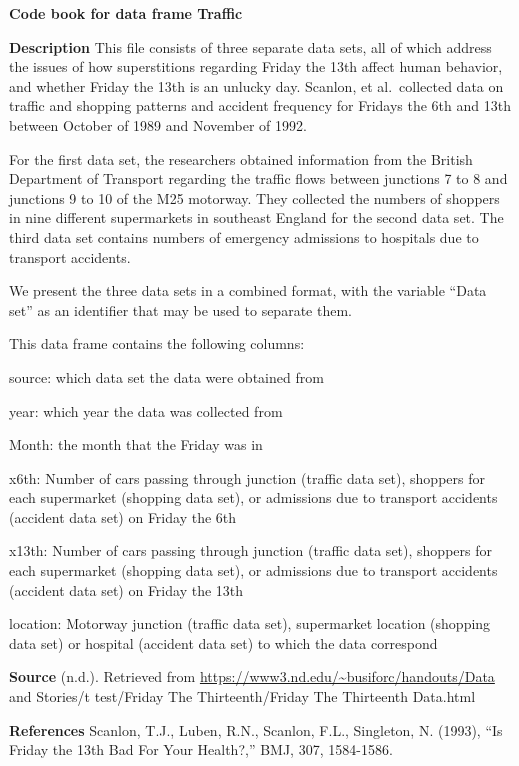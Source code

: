 \documentclass[
]{book}
\begin{document}
\textbf{Code book for data frame Traffic}

\textbf{Description}
This file consists of three separate data sets, all of which address the issues of how superstitions regarding Friday the 13th affect human behavior, and whether Friday the 13th is an unlucky day. Scanlon, et al.~collected data on traffic and shopping patterns and accident frequency for Fridays the 6th and 13th between October of 1989 and November of 1992.

For the first data set, the researchers obtained information from the British Department of Transport regarding the traffic flows between junctions 7 to 8 and junctions 9 to 10 of the M25 motorway. They collected the numbers of shoppers in nine different supermarkets in southeast England for the second data set. The third data set contains numbers of emergency admissions to hospitals due to transport accidents.

We present the three data sets in a combined format, with the variable ``Data set'' as an identifier that may be used to separate them.

This data frame contains the following columns:

source: which data set the data were obtained from

year: which year the data was collected from

Month: the month that the Friday was in

x6th: Number of cars passing through junction (traffic data set), shoppers for each supermarket (shopping data set), or admissions due to transport accidents (accident data set) on Friday the 6th

x13th: Number of cars passing through junction (traffic data set), shoppers for each supermarket (shopping data set), or admissions due to transport accidents (accident data set) on Friday the 13th

location: Motorway junction (traffic data set), supermarket location (shopping data set) or hospital (accident data set) to which the data correspond

\textbf{Source}
(n.d.). Retrieved from \url{https://www3.nd.edu/~busiforc/handouts/Data} and Stories/t test/Friday The Thirteenth/Friday The Thirteenth Data.html

\textbf{References}
Scanlon, T.J., Luben, R.N., Scanlon, F.L., Singleton, N. (1993), ``Is Friday the 13th Bad For Your Health?,'' BMJ, 307, 1584-1586.
\end{document}
